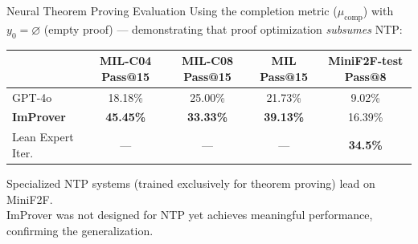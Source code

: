 \begin{frame}{Neural Theorem Proving Evaluation}
\vspace{0.4em}
Using the completion metric ($\mu_{\mathrm{comp}}$) with $y_0 = \varnothing$ (empty proof) --- demonstrating that proof optimization \emph{subsumes} NTP:
\vspace{0.4em}
\begin{center}
\small
\begin{tabular}{l|ccc|c}
\toprule
& MIL-C04 Pass@15 & MIL-C08 Pass@15 & MIL Pass@15 & MiniF2F-test Pass@8\\
\midrule
GPT-4o & 18.18\% & 25.00\% & 21.73\% & 9.02\%\\
\textbf{ImProver} & \textbf{45.45\%} & \textbf{33.33\%} & \textbf{39.13\%} & 16.39\%\\
Lean Expert Iter. & --- & --- & --- & \textbf{34.5\%}\\
\bottomrule
\end{tabular}
\end{center}
\vspace{0.4em}
\small Specialized NTP systems (trained exclusively for theorem proving) lead on MiniF2F.\\
ImProver was not designed for NTP yet achieves meaningful performance, confirming the generalization.
\end{frame}

